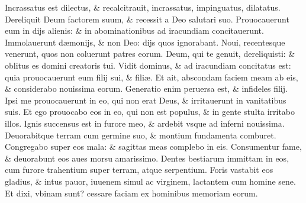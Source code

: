 \documentclass[a5paper,10pt]{book}
\def\ae{æ}
\begin{document}
\begin{multicols*}{2}
\newline \color{red} I\color{black}ncrassatus est dilectus, \& recalcitrauit, incrassatus, impinguatus, dilatatus.
\newline \color{red} D\color{black}ereliquit Deum factorem suum, \& recessit a Deo salutari suo.
\newline \color{red} P\color{black}rouocauerunt eum in dijs alienis: \& in abominationibus ad iracundiam concitauerunt.
\newline \color{red} I\color{black}mmolauerunt d\ae monijs, \& non Deo: dijs quos ignorabant.
\newline \color{red} N\color{black}oui, recentesque venerunt, quos non coluerunt patres eorum.
\newline \color{red} D\color{black}eum, qui te genuit, dereliquisti: \& oblitus es domini creatoris tui.
\newline \color{red} V\color{black}idit dominus, \& ad iracundiam concitatus est: quia prouocauerunt eum filij sui, \& fili\ae .
\newline \color{red} E\color{black}t ait, abscondam faciem meam ab eis, \& considerabo nouissima eorum.
\newline \color{red} G\color{black}eneratio enim peruersa est, \& infideles filij.
\newline \color{red} I\color{black}psi me prouocauerunt in eo, qui non erat Deus, \& irritauerunt in vanitatibus suis.
\newline \color{red} E\color{black}t ego prouocabo eos in eo, qui non est populus, \& in gente stulta irritabo illos.
\newline \color{red} I\color{black}gnis succensus est in furore meo, \& ardebit vsque ad inferni nouissima.
\newline \color{red} D\color{black}euorabitque terram cum germine suo, \& montium fundamenta comburet.
\newline \color{red} C\color{black}ongregabo super eos mala: \& sagittas meas complebo in eis.
\newline \color{red} C\color{black}onsumentur fame, \& deuorabunt eos aues morsu amarissimo.
\newline \color{red} D\color{black}entes bestiarum immittam in eos, cum furore trahentium super terram, atque serpentium.
\newline \color{red} F\color{black}oris vastabit eos gladius, \& intus pauor, iuuenem simul ac virginem, lactantem cum homine sene.
\newline \color{red} E\color{black}t dixi, vbinam sunt? cessare faciam ex hominibus memoriam eorum.%

\end{multicols*}
\end{document}
